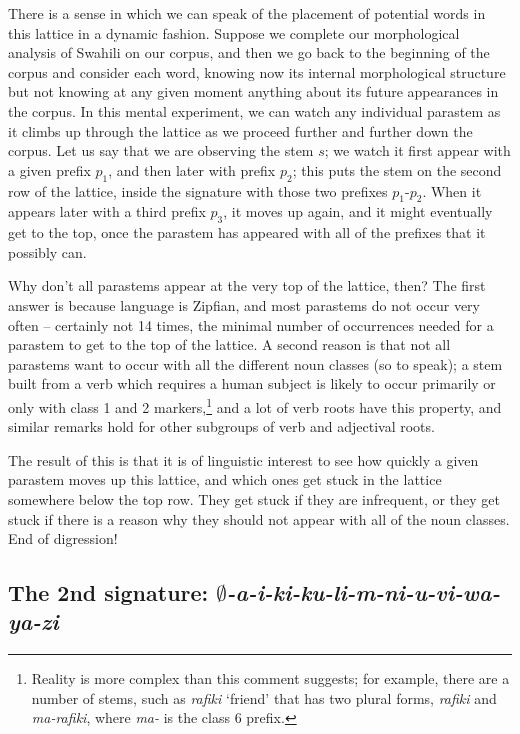 \documentclass[output=paper,colorlinks,citecolor=brown]{langscibook}
\begin{document}
There is a sense in which we can speak of the placement of potential words in this lattice in a dynamic fashion. Suppose we complete our morphological analysis of Swahili on our corpus, and then we go back to the beginning of the corpus and consider each word, knowing now its internal morphological structure but not knowing at any given moment anything about its future appearances in the corpus. In this mental experiment, we can watch any individual parastem as it climbs up through the lattice as we proceed further and further down the corpus. Let us say that we are observing the stem $s$; we watch it first appear with a given prefix $p_1$, and then later with prefix $p_2$; this puts the stem on the second row of the lattice, inside the signature with those two prefixes $p_1$-$p_2$. When it appears later with a third prefix $p_3$, it moves up again, and it might eventually get to the top, once the parastem has appeared with all of the prefixes that it possibly can. 

Why don't all parastems appear at the very top of the lattice, then? The first answer is because language is Zipfian, and most parastems do not occur very often -- certainly not 14 times, the minimal number of occurrences needed for a parastem to get to the top of the lattice. A second reason is that not all parastems want to occur with all the different noun classes (so to speak); a stem built from a verb which requires a human subject is likely to occur primarily or only with class 1 and 2 markers,\footnote{Reality is more complex than this comment suggests; for example, there are a number of stems, such as \textit{rafiki} `friend' that has two plural forms, \textit{rafiki} and \textit{ma-rafiki}, where \textit{ma-} is the class 6 prefix.} and a lot of verb roots have this property, and similar remarks hold for other subgroups of verb and adjectival roots. 

The result of this is that it is of linguistic interest to see how quickly a given parastem moves up this lattice, and which ones get stuck in the lattice somewhere below the top row. They get stuck if they are infrequent, or they get stuck if there is a reason why they should not appear with all of the noun classes. End of digression!

\subsection{The 2nd signature: \textit{$\emptyset$-a-i-ki-ku-li-m-ni-u-vi-wa-ya-zi} }
 
\end{document}
